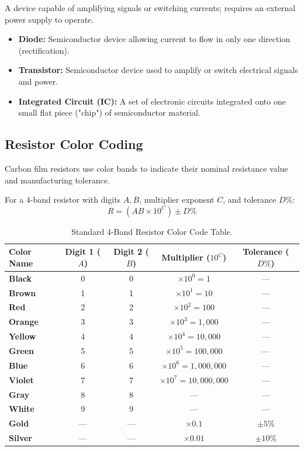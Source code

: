 \begin{definition}
A device capable of amplifying signals or switching currents; requires an external power supply to operate.
\begin{itemize}
    \item \textbf{Diode:} Semiconductor device allowing current to flow in only one direction (rectification).
    \item \textbf{Transistor:} Semiconductor device used to amplify or switch electrical signals and power.
    \item \textbf{Integrated Circuit (IC):} A set of electronic circuits integrated onto one small flat piece ("chip") of semiconductor material.
\end{itemize}
\end{definition}

\subsection{Resistor Color Coding}
Carbon film resistors use color bands to indicate their nominal resistance value and manufacturing tolerance.

\begin{keyequation}
For a 4-band resistor with digits $A, B$, multiplier exponent $C$, and tolerance $D\%$:
\begin{equation}
    R = (AB \times 10^C) \pm D\%
\end{equation}
\end{keyequation}

\begin{table}[htbp]
\centering
\small
\begin{tabularx}{\textwidth}{lcccc}
\toprule
\textbf{Color Name} & \textbf{Digit 1 ($A$)} & \textbf{Digit 2 ($B$)} & \textbf{Multiplier ($10^C$)} & \textbf{Tolerance ($D\%$)} \\
\midrule
\textbf{Black} & 0 & 0 & $\times 10^0 = 1$ & — \\
\textbf{Brown} & 1 & 1 & $\times 10^1 = 10$ & — \\
\textbf{Red} & 2 & 2 & $\times 10^2 = 100$ & — \\
\textbf{Orange} & 3 & 3 & $\times 10^3 = 1,000$ & — \\
\textbf{Yellow} & 4 & 4 & $\times 10^4 = 10,000$ & — \\
\textbf{Green} & 5 & 5 & $\times 10^5 = 100,000$ & — \\
\textbf{Blue} & 6 & 6 & $\times 10^6 = 1,000,000$ & — \\
\textbf{Violet} & 7 & 7 & $\times 10^7 = 10,000,000$ & — \\
\textbf{Gray} & 8 & 8 & — & — \\
\textbf{White} & 9 & 9 & — & — \\
\textbf{Gold} & — & — & $\times 0.1$ & $\pm 5\%$ \\
\textbf{Silver} & — & — & $\times 0.01$ & $\pm 10\%$ \\
\bottomrule
\end{tabularx}
\caption{Standard 4-Band Resistor Color Code Table.}
\label{tab:resistor-color-code}
\end{table}

